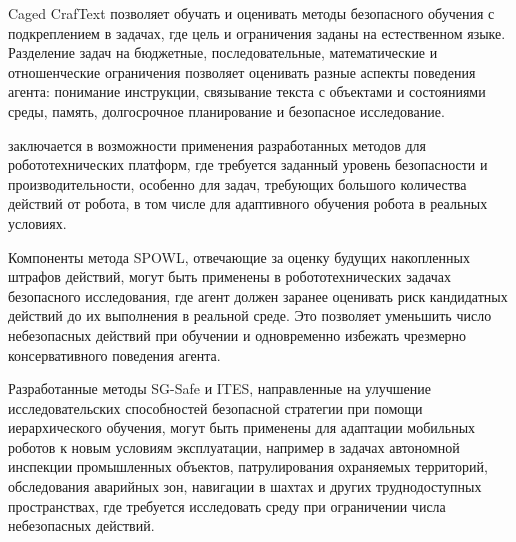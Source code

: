 Caged CrafText позволяет обучать и оценивать методы безопасного обучения с подкреплением в задачах, где цель и ограничения заданы на естественном языке. Разделение задач на бюджетные, последовательные, математические и отношенческие ограничения позволяет оценивать разные аспекты поведения агента: понимание инструкции, связывание текста с объектами и состояниями среды, память, долгосрочное планирование и безопасное исследование.

{\influence} заключается в возможности применения разработанных методов для робототехнических платформ, где требуется заданный уровень безопасности и производительности, особенно для задач, требующих большого количества действий от робота, в том числе для адаптивного обучения робота в реальных условиях.

Компоненты метода SPOWL, отвечающие за оценку будущих накопленных штрафов действий, могут быть применены в робототехнических задачах безопасного исследования, где агент должен заранее оценивать риск кандидатных действий до их выполнения в реальной среде. Это позволяет уменьшить число небезопасных действий при обучении и одновременно избежать чрезмерно консервативного поведения агента.

Разработанные методы SG-Safe и ITES, направленные на улучшение исследовательских способностей безопасной стратегии при помощи иерархического обучения, могут быть применены для адаптации мобильных роботов к новым условиям эксплуатации, например в задачах автономной инспекции промышленных объектов, патрулирования охраняемых территорий, обследования аварийных зон, навигации в шахтах и других труднодоступных пространствах, где требуется исследовать среду при ограничении числа небезопасных действий.

